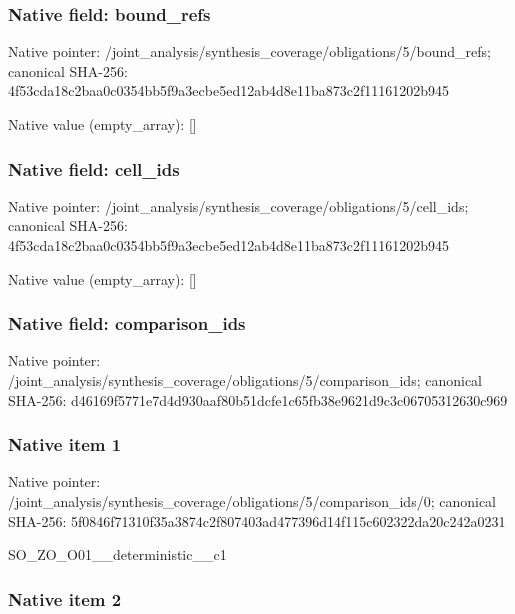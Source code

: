 \documentclass[10pt,a4paper]{article}
\begin{document}
\subsubsection{Native field: bound\_refs}


Native pointer: /joint\_analysis/synthesi\allowbreak{}s\_coverage/obligations/5\allowbreak{}/bound\_refs; canonical SHA-256: 4f53cda18c2baa0c0354bb5f\allowbreak{}9a3ecbe5ed12ab4d8e11ba87\allowbreak{}3c2f11161202b945



Native value (empty\_array): []



\subsubsection{Native field: cell\_ids}


Native pointer: /joint\_analysis/synthesi\allowbreak{}s\_coverage/obligations/5\allowbreak{}/cell\_ids; canonical SHA-256: 4f53cda18c2baa0c0354bb5f\allowbreak{}9a3ecbe5ed12ab4d8e11ba87\allowbreak{}3c2f11161202b945



Native value (empty\_array): []



\subsubsection{Native field: comparison\_ids}


Native pointer: /joint\_analysis/synthesi\allowbreak{}s\_coverage/obligations/5\allowbreak{}/comparison\_ids; canonical SHA-256: d46169f5771e7d4d930aaf80\allowbreak{}b51dcfe1c65fb38e9621d9c3\allowbreak{}c06705312630c969



\subsubsection{Native item 1}


Native pointer: /joint\_analysis/synthesi\allowbreak{}s\_coverage/obligations/5\allowbreak{}/comparison\_ids/0; canonical SHA-256: 5f0846f71310f35a3874c2f8\allowbreak{}07403ad477396d14f115c602\allowbreak{}322da20c242a0231


SO\_ZO\_O01\_\_deterministic\_\_c1


\subsubsection{Native item 2}
\end{document}
